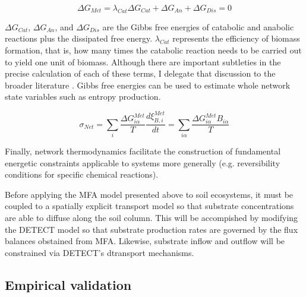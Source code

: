 \begin{equation}
        \Delta G_{Met} = \lambda_{Cat} \Delta G_{Cat} + \Delta G_{An} + \Delta G_{Dis} = 0
\end{equation}

$\Delta G_{Cat}$, $\Delta G_{An}$, and $\Delta G_{Dis}$ are the Gibbs free energies of catabolic and anabolic reactions plus the dissipated free energy. $\lambda_{Cat}$ represents the efficiency of biomass formation, that is, how many times the catabolic reaction needs to be carried out to yield one unit of biomass. Although there are important subtleties in the precise calculation of each of these terms, I delegate that discussion to the broader literature \cite{kleerebezem2010a, desmond-le_quemener_thermodynamic_2014}. Gibbs free energies can be used to estimate whole network state variables such as entropy production.

\begin{equation}
         \sigma_{Net} = \sum_{i} \dfrac{\Delta G^{Met}_{i\alpha}}{T} \dfrac{d\xi^{Met}_{B, i}}{dt} = \sum_{i \alpha} \dfrac{\Delta G^{Met}_{i\alpha} B_{i\alpha}}{T} 
     \end{equation}

Finally, network thermodynamics facilitate the construction of fundamental energetic constraints applicable to systems more generally (e.g. reversibility conditions for specific chemical reactions). 


Before applying the MFA model presented above to soil ecosystems, it must be coupled to a spatially explicit transport model so that substrate concentrations are able to diffuse along the soil column. This will be accompished by modifying the DETECT model \cite{ryan_modeling_2018} so that substrate production rates are governed by the flux balances obstained from MFA. Likewise, substrate inflow and outflow will be constrained via DETECT's dtransport mechanisms. 

\subsection{Empirical validation}


